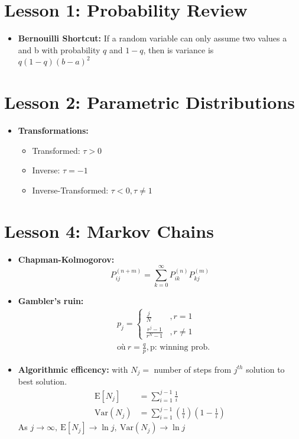 \documentclass[10pt, french]{article}
\begin{document}
\small
\begin{multicols*}{3} %
\def\SectionColor{magenta!80!white}
\section*{Lesson 1: Probability Review}
\begin{itemize}[align=left,leftmargin=*]
    \item \textbf{Bernouilli Shortcut:} If a random variable can only assume two values a and b with probability $q$ and $1-q$, then is variance is \\ $q(1-q)(b-a)^2$
\end{itemize}

\section*{Lesson 2: Parametric Distributions}
\begin{itemize}[align=left,leftmargin=*]
    \item \textbf{Transformations:} 
    \begin{itemize}
        \item Transformed: $\tau > 0$
        \item Inverse: $\tau = -1$
        \item Inverse-Transformed: $\tau < 0, \tau \neq 1$
    \end{itemize}
\end{itemize}

\def\SectionColor{brown!80!white}
\section*{Lesson 4: Markov Chains}
\begin{itemize}[align=left,leftmargin=*]
    \item \textbf{Chapman-Kolmogorov:} \[ P_{ij}^{(n+m)} = \sum_{k=0}^\infty P_{ik}^{(n)}  P_{kj}^{(m)} \]
    \item \textbf{Gambler's ruin:} 
    \begin{align*}
        &p_j=
        \left\{
        \begin{array}{cc}
        \frac{j}{N} & ,r=1  \\
        \frac{r^j-1}{r^N-1} & ,r \neq 1  
        \end{array}
        \right. \\
        & \text{où}\: r = \frac{q}{p}, \text{p: winning prob.}
    \end{align*} 
    \item \textbf{Algorithmic efficency:} with $N_j=$ number of steps from $j^{th}$ solution to best solution.
    \begin{align*}
        \mathrm{E}[N_j] &= \sum_{i=1}^{j-1} \frac{1}{i} \\
        \text{Var}(N_j) &= \sum_{i=1}^{j-1} \left( \frac{1}{i} \right) \left(1 -  \frac{1}{i} \right)
    \end{align*}
    As $j \rightarrow \infty,\: \mathrm{E}[N_j] \rightarrow \ln j,\: \text{Var}(N_j) \rightarrow \ln j$
\end{itemize}


\end{multicols*}
\end{document}
